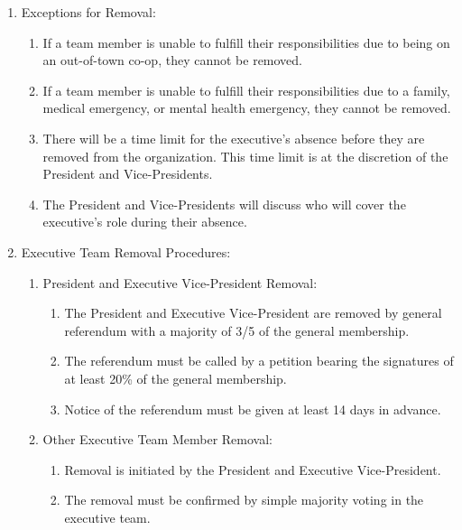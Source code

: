 \documentclass[12pt,a4paper]{article}
\begin{document}
\begin{enumerate}
\item Exceptions for Removal:

\begin{enumerate}
\item If a team member is unable to fulfill their responsibilities due to being on an out-of-town co-op, they cannot be removed.

\item If a team member is unable to fulfill their responsibilities due to a family, medical emergency, or mental health emergency, they cannot be removed.

\item There will be a time limit for the executive's absence before they are removed from the organization. This time limit is at the discretion of the President and Vice-Presidents.

\item The President and Vice-Presidents will discuss who will cover the executive's role during their absence.
\end{enumerate}

\item Executive Team Removal Procedures:

\begin{enumerate}
\item President and Executive Vice-President Removal:

\begin{enumerate}
\item The President and Executive Vice-President are removed by general referendum with a majority of 3/5 of the general membership.

\item The referendum must be called by a petition bearing the signatures of at least 20\% of the general membership.

\item Notice of the referendum must be given at least 14 days in advance.
\end{enumerate}

\item Other Executive Team Member Removal:

\begin{enumerate}
\item Removal is initiated by the President and Executive Vice-President.

\item The removal must be confirmed by simple majority voting in the executive team.


\end{enumerate}
\end{enumerate}
\end{enumerate}
\end{document}
